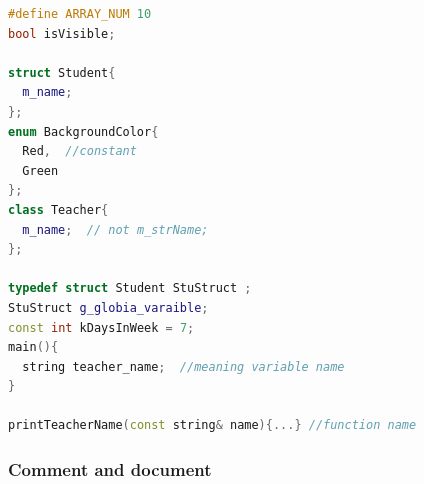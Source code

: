 \documentclass[a4paper,12pt,twoside]{book}
\begin{document}
\begin{lstlisting}[frame=single, language=c++]
#define ARRAY_NUM 10
bool isVisible;

struct Student{
  m_name;
};
enum BackgroundColor{
  Red,  //constant
  Green
};
class Teacher{
  m_name;  // not m_strName;  
};

typedef struct Student StuStruct ;
StuStruct g_globia_varaible;
const int kDaysInWeek = 7;
main(){
  string teacher_name;  //meaning variable name
}

printTeacherName(const string& name){...} //function name
\end{lstlisting}

\subsubsection{Comment and document}
\end{document}
